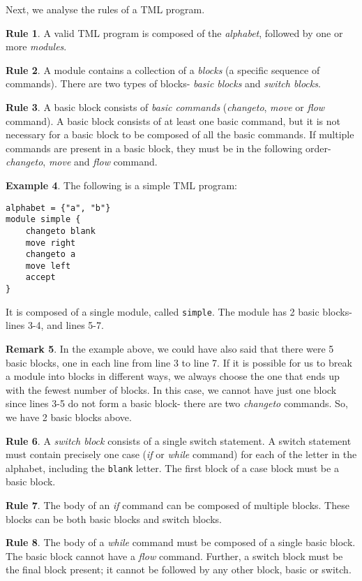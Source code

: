 \documentclass{amsart}
\theoremstyle{definition}
\newtheorem{rules}{Rule}[section]
\newtheorem{remark}[rules]{Remark}
\newtheorem{example}[rules]{Example}
\begin{document}
    Next, we analyse the rules of a TML program.
    \begin{rules}
        A valid TML program is composed of the \emph{alphabet}, followed by one or more \emph{modules}.
    \end{rules}
    \begin{rules}
        A module contains a collection of a \emph{blocks} (a specific sequence of commands). There are two types of blocks- \emph{basic blocks} and \emph{switch blocks}.
    \end{rules}
    \begin{rules}
        A basic block consists of \emph{basic commands} (\textit{changeto}, \textit{move} or \textit{flow} command). A basic block consists of at least one basic command, but it is not necessary for a basic block to be composed of all the basic commands. If multiple commands are present in a basic block, they must be in the following order- \textit{changeto}, \textit{move} and \textit{flow} command.
    \end{rules}
    \begin{example}
        The following is a simple TML program:
\begin{lstlisting}[language=TML]
alphabet = {"a", "b"}
module simple {
    changeto blank
    move right
    changeto a
    move left
    accept
}
\end{lstlisting}
    It is composed of a single module, called \texttt{simple}. The module has 2 basic blocks- lines 3-4, and lines 5-7.
    \end{example}
    \begin{remark}
        In the example above, we could have also said that there were 5 basic blocks, one in each line from line 3 to line 7. If it is possible for us to break a module into blocks in different ways, we always choose the one that ends up with the fewest number of blocks. In this case, we cannot have just one block since lines 3-5 do not form a basic block- there are two \textit{changeto} commands. So, we have 2 basic blocks above.
    \end{remark}
    
    \begin{rules}
        A \emph{switch block} consists of a single switch statement. A switch statement must contain precisely one case (\textit{if} or \textit{while} command) for each of the letter in the alphabet, including the \texttt{blank} letter. The first block of a case block must be a basic block.
    \end{rules}
    \begin{rules}
        The body of an \textit{if} command can be composed of multiple blocks. These blocks can be both basic blocks and switch blocks.
    \end{rules}
    \begin{rules}
        The body of a \textit{while} command must be composed of a single basic block. The basic block cannot have a \textit{flow} command. Further, a switch block must be the final block present; it cannot be followed by any other block, basic or switch.
    \end{rules}
    
\end{document}
